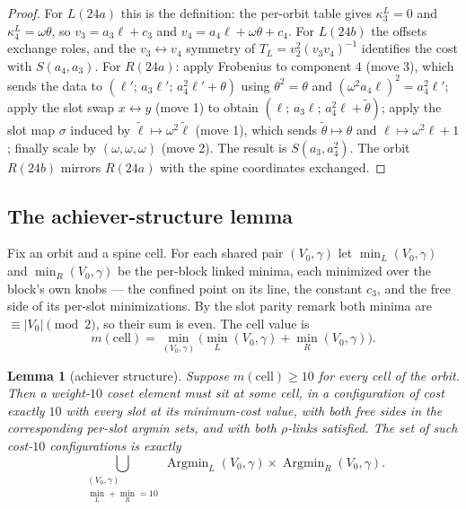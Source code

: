 \documentclass[11pt]{article}
\newcommand{\wt}[1]{\lvert #1\rvert}
\newcommand{\slab}{\ell}                          %
\theoremstyle{plain}
\newtheorem{lemma}{Lemma}[section]
\theoremstyle{definition}
\theoremstyle{remark}
\begin{document}
\begin{proof}
For $L(24a)$ this is the definition: the per-orbit table gives $\kappa_3^L=0$ and
$\kappa_4^L=\omega\theta$, so $v_3=a_3\slab+c_3$ and
$v_4=a_4\slab+\omega\theta+c_4$. For $L(24b)$ the offsets exchange roles, and the
$v_3\leftrightarrow v_4$ symmetry of $T_L=v_2^2(v_3v_4)^{-1}$ identifies the cost
with $S(a_4,a_3)$. For $R(24a)$: apply Frobenius to component $4$ (move 3), which
sends the data to $(\slab';\,a_3\slab';\,a_4^2\slab'+\theta)$ using $\theta^2=
\theta$ and $(\omega^2 a_4\slab)^2=a_4^2\slab'$; apply the slot swap
$x\leftrightarrow y$ (move 1) to obtain $(\slab;\,a_3\slab;\,a_4^2\slab+
\tilde\theta)$; apply the slot map $\sigma$ induced by
$\tilde{\slab}\mapsto\omega^2\tilde{\slab}$ (move 1), which sends
$\tilde\theta\mapsto\theta$ and $\slab\mapsto\omega^2\slab+1$; finally scale by
$(\omega,\omega,\omega)$ (move 2). The result is $S(a_3,a_4^2)$. The orbit
$R(24b)$ mirrors $R(24a)$ with the spine coordinates exchanged.
\end{proof}

\subsection{The achiever-structure lemma}\label{ssec:achiever}

Fix an orbit and a spine cell. For each shared pair $(V_0,\gamma)$ let
$\min_L(V_0,\gamma)$ and $\min_R(V_0,\gamma)$ be the per-block linked minima,
each minimized over the block's own knobs --- the confined point on its line, the
constant $c_3$, and the free side of its per-slot minimizations. By the slot
parity remark both minima are $\equiv\wt{V_0}\pmod 2$, so their sum is even. The
cell value is
\[
  m(\text{cell})=\min_{(V_0,\gamma)}\bigl(\min_L(V_0,\gamma)+\min_R(V_0,\gamma)\bigr).
\]

\begin{lemma}[achiever structure]\label{lem:achiever}
Suppose $m(\text{cell})\ge 10$ for every cell of the orbit. Then a weight-$10$
coset element must sit at some cell, in a configuration of cost exactly $10$ with
every slot at its minimum-cost value, with both free sides in the corresponding
per-slot argmin sets, and with both $\rho$-links satisfied. The set of such
cost-$10$ configurations is exactly
\[
  \bigcup_{\substack{(V_0,\gamma)\\ \min_L+\min_R=10}}
    \operatorname{Argmin}_L(V_0,\gamma)\times\operatorname{Argmin}_R(V_0,\gamma).
\]
\end{lemma}
\end{document}
